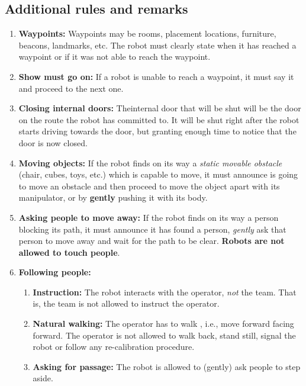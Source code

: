 \subsection{Additional rules and remarks}
\begin{enumerate}
	\item \textbf{Waypoints:} Waypoints may be rooms, placement locations, furniture, beacons, landmarks, etc. The robot must clearly state when it has reached a waypoint or if it was not able to reach the waypoint.

	\item \textbf{Show must go on:} If a robot is unable to reach a waypoint, it must say it and proceed to the next one.

	\item \textbf{Closing internal doors:}  Theinternal door that will be shut will be the door on the route the robot has committed to. It will be shut right after the robot starts driving towards the door, but granting enough time to notice that the door is now closed.	

	\item \textbf{Moving objects:} If the robot finds on its way a \textit{static movable obstacle} (chair, cubes, toys, etc.) which is capable to move, it must announce is going to move an obstacle and then proceed to move the object apart with its manipulator, or by \textbf{gently} pushing it with its body.

	\item \textbf{Asking people to move away:} If the robot finds on its way a person blocking its path, it must announce it has found a person, \textit{gently} ask that person to move away and wait for the path to be clear. \textbf{Robots are not allowed to touch people}.

	\item \textbf{Following people:} 
	\begin{enumerate}
		\item \textbf{Instruction:} The robot interacts with the operator, \emph{not} the team. That is, the team is not allowed to instruct the operator.
		\item \textbf{Natural walking:} The operator has to walk , i.e., move forward facing forward. 
		  The operator is not allowed to walk back, stand still, signal the robot or follow any re-calibration procedure.
		\item \textbf{Asking for passage:} The robot is allowed to (gently) ask people to step aside.
	\end{enumerate}
\end{enumerate}

